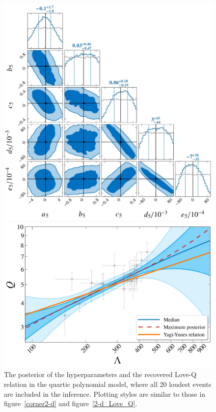 \documentclass[a4paper,11pt]{article}
\begin{document}
\begin{figure}
\begin{minipage}[t]{0.49\textwidth}
\centering
\includegraphics[width=0.8\linewidth]{fig_Hyper_parameter_5d.pdf}%
\end{minipage}
\hfill
\begin{minipage}[t]{0.49\textwidth}
\includegraphics[width=\linewidth]{fig_hierarchical_results_APR4_5d.pdf}
\end{minipage}
    \caption{The posterior of the hyperparameters and the recovered Love-Q relation
    in the quartic polynomial model, where all 20 loudest events are included in
    the inference. Plotting styles are similar to those in figure~\ref{corner2-d} and
    figure~\ref{2-d_Love_Q}.
    } \label{5-d_Love_Q} 
\end{figure}
\end{document}

